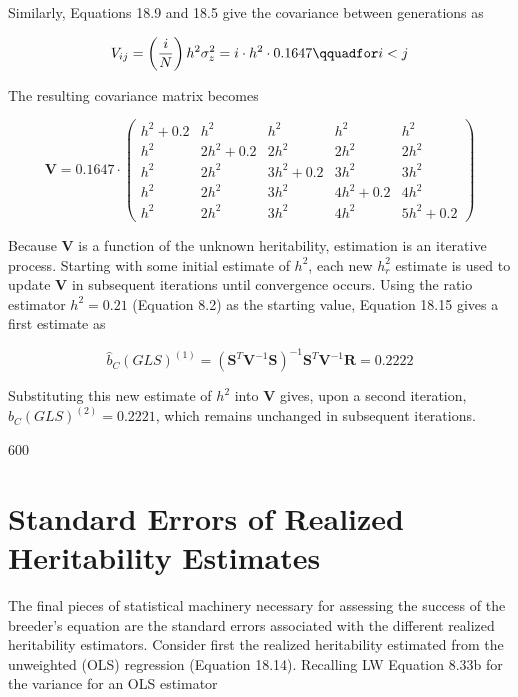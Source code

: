 \documentclass{article}
\begin{document}
Similarly, Equations 18.9 and 18.5 give the covariance between generations as

\begin{equation}
V_{ij}=\left(\frac{i}{N}\right)h^{2}\sigma_{z}^{2}=i\cdot h^{2}\cdot0.1647\qquadfor i<j
\end{equation}

The resulting covariance matrix becomes

\begin{equation}
\mathbf{V}=0.1647\cdot\begin{pmatrix}h^{2}+0.2&h^{2}&h^{2}&h^{2}&h^{2}\\h^{2}&2h^{2}+0.2&2h^{2}&2h^{2}&2h^{2}\\h^{2}&2h^{2}&3h^{2}+0.2&3h^{2}&3h^{2}\\h^{2}&2h^{2}&3h^{2}&4h^{2}+0.2&4h^{2}\\h^{2}&2h^{2}&3h^{2}&4h^{2}&5h^{2}+0.2\end{pmatrix}
\end{equation}

Because  $ \mathbf{V} $ is a function of the unknown heritability, estimation is an iterative process. Starting with some initial estimate of  $ h^2 $, each new  $ h_r^2 $ estimate is used to update  $ \mathbf{V} $ in subsequent iterations until convergence occurs. Using the ratio estimator  $ h^2 = 0.21 $ (Equation 8.2) as the starting value, Equation 18.15 gives a first estimate as

\begin{equation}
\widehat{b}_{C}(GLS)^{(1)}=(\mathbf{S}^{T}\mathbf{V}^{-1}\mathbf{S})^{-1}\mathbf{S}^{T}\mathbf{V}^{-1}\mathbf{R}=0.2222
\end{equation}

Substituting this new estimate of  $ h^2 $ into  $ \mathbf{V} $ gives, upon a second iteration,  $ \widehat{b}_C(GLS)^{(2)} = 0.2221 $, which remains unchanged in subsequent iterations.

600

\section{Standard Errors of Realized Heritability Estimates}
The final pieces of statistical machinery necessary for assessing the success of the breeder's equation are the standard errors associated with the different realized heritability estimators. Consider first the realized heritability estimated from the unweighted (OLS) regression (Equation 18.14). Recalling LW Equation 8.33b for the variance for an OLS estimator
\end{document}
